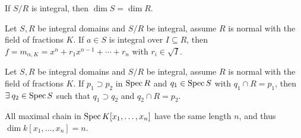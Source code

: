 \begin{theorem}
  If $S/R$ is integral, then $\dim S = \dim R$.
\end{theorem}

\begin{prop}
  Let $S, R$ be integral domains and $S/R$ be integral, assume $R$ is normal
  with the field of fractions $K$. If $a \in S$ is integral over $I \subseteq R$, then
  $f = m_{\alpha, K} = x^n + r_1 x^{n-1} + \dotsm + r_n$ with $r_i \in \sqrt{I}$.
\end{prop}

\begin{theorem}
  Let $S, R$ be integral domains and $S/R$ be integral, assume $R$ is normal
  with the field of fractions $K$. If $p_1 \supset p_2$ in $\operatorname{Spec} R$ and $q_1 \in \operatorname{Spec} S$ with $q_1 \cap R = p_1$,
  then $\exists q_2 \in \Spec S$ such that $q_1 \supset q_2$ and $q_2 \cap R = p_2$.
\end{theorem}

\begin{theorem}
  All maximal chain in $\operatorname{Spec} K[x_1, \dots, x_n]$ have the same length $n$, and thus $\dim k[x_1, \dots, x_n] = n$.
\end{theorem}
